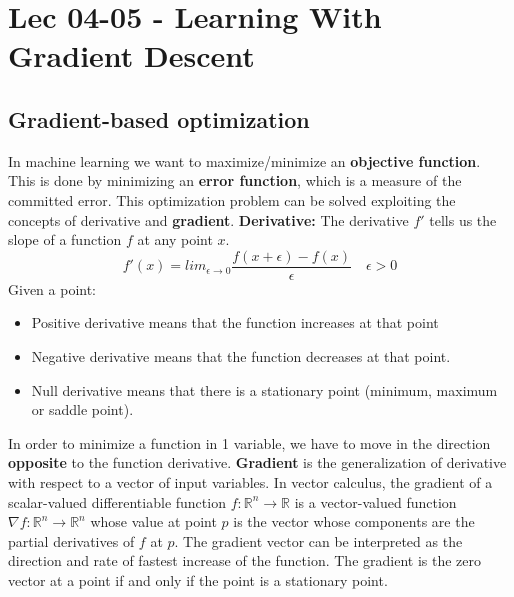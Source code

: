 \chapter{Lec 04-05 - Learning With Gradient Descent}

\section{Gradient-based optimization}
In machine learning we want to maximize/minimize an \textbf{objective function}. This is done by minimizing an \textbf{error function}, which is a measure of the committed error. This optimization problem can be solved exploiting the concepts of derivative and \textbf{gradient}.\newline\newline 
\textbf{Derivative:}\newline
The derivative $f'$ tells us the slope of a function $f$ at any point $x$.
\[f'(x) = lim_{\epsilon \rightarrow 0}\frac{f(x + \epsilon) - f(x)}{\epsilon} \quad \epsilon > 0\]
Given a point:
\begin{itemize}
    \item Positive derivative means that the function increases at that point
    \item Negative derivative means that the function decreases at that point.
    \item Null derivative means that there is a stationary point (minimum, maximum or saddle point).
\end{itemize}
In order to minimize a function in 1 variable, we have to move in the direction \textbf{opposite} to the function derivative.\newline\newline
\textbf{Gradient} is the generalization of derivative with respect to a vector of input variables. In vector calculus, the gradient of a scalar-valued differentiable function $f: \mathbb{R}^{n} \rightarrow \mathbb{R}$ is a vector-valued function $\nabla f: \mathbb{R}^{n} \rightarrow \mathbb{R}^{n}$ whose value at point $p$ is the vector whose components are the partial derivatives of $f$ at $p$.\newline\newline
The gradient vector can be interpreted as the direction and rate of fastest increase of the function. The gradient is the zero vector at a point if and only if the point is a stationary point.
